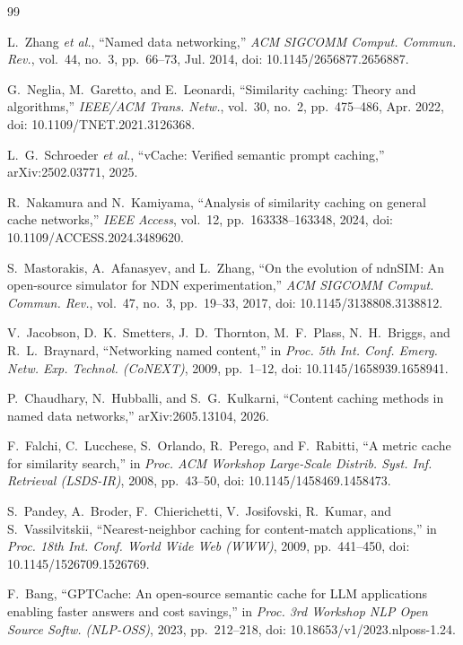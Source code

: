 \documentclass[11pt,a4paper]{article}
\begin{document}
\begin{thebibliography}{99}

L.~Zhang \emph{et al.}, ``Named data networking,'' \emph{ACM SIGCOMM Comput. Commun. Rev.},
vol.~44, no.~3, pp.~66--73, Jul. 2014, doi: 10.1145/2656877.2656887.

G.~Neglia, M.~Garetto, and E.~Leonardi, ``Similarity caching: Theory and algorithms,''
\emph{IEEE/ACM Trans. Netw.}, vol.~30, no.~2, pp.~475--486, Apr. 2022,
doi: 10.1109/TNET.2021.3126368.

L.~G.~Schroeder \emph{et al.}, ``vCache: Verified semantic prompt caching,''
arXiv:2502.03771, 2025.

R.~Nakamura and N.~Kamiyama, ``Analysis of similarity caching on general cache networks,''
\emph{IEEE Access}, vol.~12, pp.~163338--163348, 2024, doi: 10.1109/ACCESS.2024.3489620.

S.~Mastorakis, A.~Afanasyev, and L.~Zhang, ``On the evolution of ndnSIM: An open-source simulator
for NDN experimentation,'' \emph{ACM SIGCOMM Comput. Commun. Rev.}, vol.~47, no.~3, pp.~19--33,
2017, doi: 10.1145/3138808.3138812.

V.~Jacobson, D.~K.~Smetters, J.~D.~Thornton, M.~F.~Plass, N.~H.~Briggs, and R.~L.~Braynard,
``Networking named content,'' in \emph{Proc. 5th Int. Conf. Emerg. Netw. Exp. Technol.
(CoNEXT)}, 2009, pp.~1--12, doi: 10.1145/1658939.1658941.

P.~Chaudhary, N.~Hubballi, and S.~G.~Kulkarni, ``Content caching methods in named data
networks,'' arXiv:2605.13104, 2026.

F.~Falchi, C.~Lucchese, S.~Orlando, R.~Perego, and F.~Rabitti, ``A metric cache for similarity
search,'' in \emph{Proc. ACM Workshop Large-Scale Distrib. Syst. Inf. Retrieval (LSDS-IR)}, 2008,
pp.~43--50, doi: 10.1145/1458469.1458473.

S.~Pandey, A.~Broder, F.~Chierichetti, V.~Josifovski, R.~Kumar, and S.~Vassilvitskii,
``Nearest-neighbor caching for content-match applications,'' in \emph{Proc. 18th Int. Conf. World
Wide Web (WWW)}, 2009, pp.~441--450, doi: 10.1145/1526709.1526769.

F.~Bang, ``GPTCache: An open-source semantic cache for LLM applications enabling faster answers and
cost savings,'' in \emph{Proc. 3rd Workshop NLP Open Source Softw. (NLP-OSS)}, 2023,
pp.~212--218, doi: 10.18653/v1/2023.nlposs-1.24.


\end{thebibliography}
\end{document}
